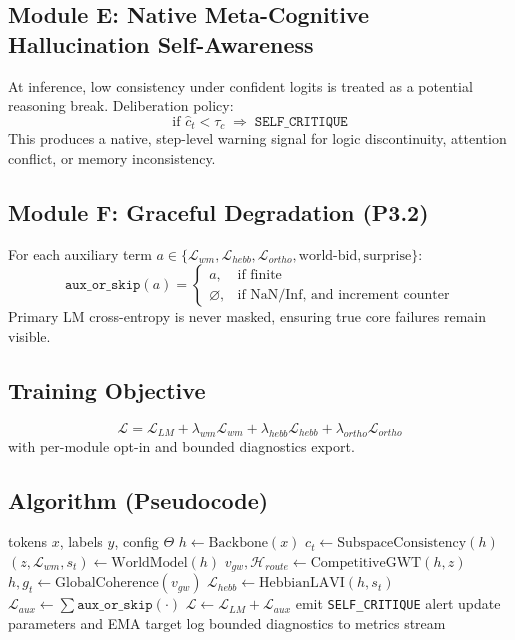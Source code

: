 \documentclass[10pt,twocolumn]{article}
\begin{document}
\subsection{Module E: Native Meta-Cognitive Hallucination Self-Awareness}
At inference, low consistency under confident logits is treated as a potential reasoning break. Deliberation policy:
\begin{equation}
\text{if }\hat{c}_t<\tau_c\;\Rightarrow\;\texttt{SELF\_CRITIQUE}
\end{equation}
This produces a native, step-level warning signal for logic discontinuity, attention conflict, or memory inconsistency.

\subsection{Module F: Graceful Degradation (P3.2)}
For each auxiliary term $a\in\{\mathcal{L}_{wm},\mathcal{L}_{hebb},\mathcal{L}_{ortho},\text{world-bid},\text{surprise}\}$:
\begin{equation}
\texttt{aux\_or\_skip}(a)=
\begin{cases}
a,&\text{if finite}\\
\varnothing,&\text{if NaN/Inf, and increment counter}
\end{cases}
\end{equation}
Primary LM cross-entropy is never masked, ensuring true core failures remain visible.

\subsection{Training Objective}
\begin{equation}
\mathcal{L}=\mathcal{L}_{LM}+\lambda_{wm}\mathcal{L}_{wm}+\lambda_{hebb}\mathcal{L}_{hebb}+\lambda_{ortho}\mathcal{L}_{ortho}
\end{equation}
with per-module opt-in and bounded diagnostics export.

\subsection{Algorithm (Pseudocode)}
\begin{algorithm}[h]
\caption{MT-LNN v2.0 Forward/Train Step}
\begin{algorithmic}[1]
\Require tokens $x$, labels $y$, config $\Theta$
\State $h \leftarrow \text{Backbone}(x)$
\State $c_t \leftarrow \text{SubspaceConsistency}(h)$
\State $(z,\mathcal{L}_{wm},s_t) \leftarrow \text{WorldModel}(h)$
\State $v_{gw},\mathcal{H}_{route} \leftarrow \text{CompetitiveGWT}(h,z)$
\State $h,g_t \leftarrow \text{GlobalCoherence}(v_{gw})$ 
\State $\mathcal{L}_{hebb}\leftarrow\text{HebbianLAVI}(h,s_t)$
\State $\mathcal{L}_{aux}\leftarrow\sum \texttt{aux\_or\_skip}(\cdot)$
\State $\mathcal{L}\leftarrow\mathcal{L}_{LM}+\mathcal{L}_{aux}$
  \State emit \texttt{SELF\_CRITIQUE} alert
\EndIf
\State update parameters and EMA target
\State log bounded diagnostics to metrics stream
\end{algorithmic}
\end{algorithm}
\end{document}
